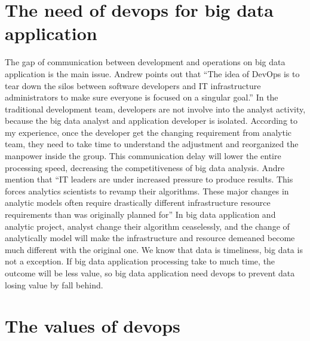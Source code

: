\documentclass[sigconf]{acmart}
\begin{document}
\section{The need of devops for big data application}

The gap of communication between development and operations on big data application is the main issue. Andrew points out that ``The idea of DevOps is to tear down the silos between software developers and IT infrastructure administrators to make sure everyone is focused on a singular goal.'' \cite{bigdata:01} In the traditional development team, developers are not involve into the analyst activity, because the big data analyst and application developer is isolated. According to my experience, once the developer get the changing requirement from analytic team, they need to take time to understand the adjustment and reorganized the manpower inside the group. This communication delay will lower the entire processing speed, decreasing the competitiveness of big data analysis. Andre mention that ``IT leaders are under increased pressure to produce results. This forces analytics scientists to revamp their algorithms. These major changes in analytic models often require drastically different infrastructure resource requirements than was originally planned for'' \cite{bigdata:01} In big data application and analytic project, analyst change their algorithm ceaselessly, and the change of analytically model will make the infrastructure and resource demeaned become much different with the original one.  We know that data is timeliness, big data is not a exception. If big data application processing take to much time, the outcome will be less value, so big data application need devops to prevent data losing value by fall behind. 

\section{The values of devops}
\end{document}
